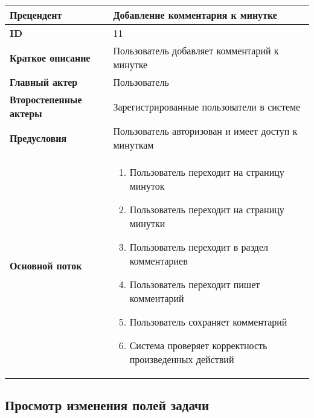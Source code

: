 \documentclass[14pt,a4paper]{extarticle}
\begin{document}
\begin{tabular}{|l|p{9cm}|}
	\hline
	\textbf{Прецендент}            & Добавление комментария к минутке                                             \\
	\hline
	\textbf{ID}                    & 11                                                                           \\
	\hline
	\textbf{Краткое описание}      & Пользователь добавляет комментарий к минутке                		      \\
	\hline
	\textbf{Главный актер}         & Пользователь                                                                 \\
	\hline
	\textbf{Второстепенные актеры} & Зарегистрированные пользователи в системе                                    \\
	\hline
	\textbf{Предусловия}           & Пользователь авторизован и имеет доступ к минуткам                           \\
	\hline
	\textbf{Основной поток}        & \begin{enumerate}
		                                 \item Пользователь переходит на страницу минуток
		                                 \item Пользователь переходит на страницу минутки
						 \item Пользователь переходит в раздел комментариев
					         \item Пользователь переходит пишет комментарий
					         \item Пользователь сохраняет комментарий
		                                 \item Система проверяет корректность произведенных действий
	                                 \end{enumerate} \\
	\hline
\end{tabular}

\subsection{Просмотр изменения полей задачи}
\end{document}
